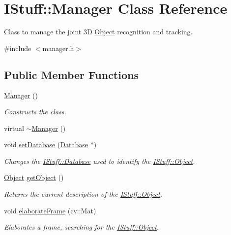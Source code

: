 \hypertarget{class_i_stuff_1_1_manager}{\section{I\-Stuff\-:\-:Manager Class Reference}
\label{class_i_stuff_1_1_manager}
}


Class to manage the joint 3\-D \hyperlink{class_i_stuff_1_1_object}{Object} recognition and tracking.  




{\ttfamily \#include $<$manager.\-h$>$}

\subsection*{Public Member Functions}
\begin{DoxyCompactItemize}
\item 
\hyperlink{class_i_stuff_1_1_manager_a1658ff9f18e38ccd9cb8b0b371b9c20b}{Manager} ()
\begin{DoxyCompactList}\small\item\em Constructs the class. \end{DoxyCompactList}\item 
virtual \hyperlink{class_i_stuff_1_1_manager_a322cad25d7007438b3a043ad02253d29}{$\sim$\-Manager} ()
\item 
void \hyperlink{class_i_stuff_1_1_manager_aa91ba11affc3ec961acaf81fc5c5e62d}{set\-Database} (\hyperlink{class_i_stuff_1_1_database}{Database} $\ast$)
\begin{DoxyCompactList}\small\item\em Changes the \hyperlink{class_i_stuff_1_1_database}{I\-Stuff\-::\-Database} used to identify the \hyperlink{class_i_stuff_1_1_object}{I\-Stuff\-::\-Object}. \end{DoxyCompactList}\item 
\hyperlink{class_i_stuff_1_1_object}{Object} \hyperlink{class_i_stuff_1_1_manager_a80d15a0a83976f63c357f65b20387e02}{get\-Object} ()
\begin{DoxyCompactList}\small\item\em Returns the current description of the \hyperlink{class_i_stuff_1_1_object}{I\-Stuff\-::\-Object}. \end{DoxyCompactList}\item 
void \hyperlink{class_i_stuff_1_1_manager_a47f17fa372382713bcc0f37aae006745}{elaborate\-Frame} (cv\-::\-Mat)
\begin{DoxyCompactList}\small\item\em Elaborates a frame, searching for the \hyperlink{class_i_stuff_1_1_object}{I\-Stuff\-::\-Object}. \end{DoxyCompactList}\item 

\end{DoxyCompactItemize}
